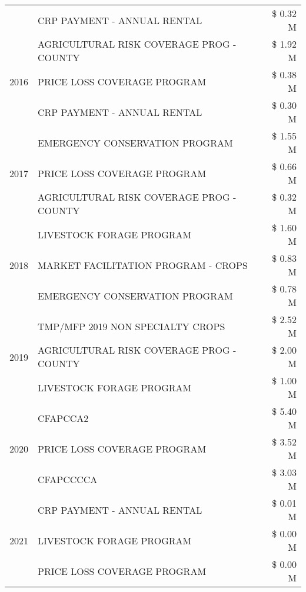 \begin{tabular}{llr}
 & CRP PAYMENT - ANNUAL RENTAL & \$ 0.32 M \\
\cline{1-3}
\multirow[t]{3}{*}{2016} & AGRICULTURAL RISK COVERAGE PROG - COUNTY & \$ 1.92 M \\
 & PRICE LOSS COVERAGE PROGRAM & \$ 0.38 M \\
 & CRP PAYMENT - ANNUAL RENTAL & \$ 0.30 M \\
\cline{1-3}
\multirow[t]{3}{*}{2017} & EMERGENCY CONSERVATION PROGRAM & \$ 1.55 M \\
 & PRICE LOSS COVERAGE PROGRAM & \$ 0.66 M \\
 & AGRICULTURAL RISK COVERAGE PROG - COUNTY & \$ 0.32 M \\
\cline{1-3}
\multirow[t]{3}{*}{2018} & LIVESTOCK FORAGE PROGRAM & \$ 1.60 M \\
 & MARKET FACILITATION PROGRAM - CROPS & \$ 0.83 M \\
 & EMERGENCY CONSERVATION PROGRAM & \$ 0.78 M \\
\cline{1-3}
\multirow[t]{3}{*}{2019} & TMP/MFP 2019 NON SPECIALTY CROPS & \$ 2.52 M \\
 & AGRICULTURAL RISK COVERAGE PROG - COUNTY & \$ 2.00 M \\
 & LIVESTOCK FORAGE PROGRAM & \$ 1.00 M \\
\cline{1-3}
\multirow[t]{3}{*}{2020} & CFAPCCA2 & \$ 5.40 M \\
 & PRICE LOSS COVERAGE PROGRAM & \$ 3.52 M \\
 & CFAPCCCCA & \$ 3.03 M \\
\cline{1-3}
\multirow[t]{3}{*}{2021} & CRP PAYMENT - ANNUAL RENTAL & \$ 0.01 M \\
 & LIVESTOCK FORAGE PROGRAM & \$ 0.00 M \\
 & PRICE LOSS COVERAGE PROGRAM & \$ 0.00 M \\
\cline{1-3}
\bottomrule
\end{tabular}
